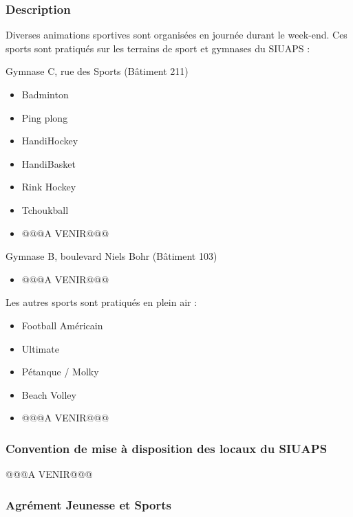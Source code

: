 \documentclass[hidelinks, paper=a4, fontsize=13pt]{report}
\begin{document}
\subsubsection{Description}

Diverses animations sportives sont organisées en journée durant le week-end. Ces sports sont pratiqués sur les terrains de sport et gymnases du SIUAPS :

Gymnase C, rue des Sports (Bâtiment 211)
\begin{itemize}
\item Badminton
\item Ping plong
\item HandiHockey
\item HandiBasket
\item Rink Hockey
\item Tchoukball
\item @@@A VENIR@@@

\end{itemize}

Gymnase B, boulevard Niels Bohr (Bâtiment 103)
\begin{itemize}
\item @@@A VENIR@@@
\end{itemize}



Les autres sports sont pratiqués en plein air :
\begin{itemize}
\item Football Américain
\item Ultimate
\item Pétanque / Molky
\item Beach Volley
\item @@@A VENIR@@@
\end{itemize}

\subsubsection{Convention de mise à disposition des locaux du SIUAPS}
@@@A VENIR@@@


\subsubsection{Agrément Jeunesse et Sports}
\end{document}
